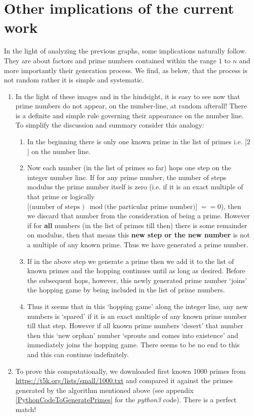 \documentclass[10pt, twoside]{article}
\begin{document}
\section{Other implications of the current work}
In the light of analyzing the previous graphs, some implications naturally follow. They are about factors and prime numbers contained within the range $1$ to $n$ and more importantly their generation process. We find, as below, that the process is not random rather it is simple and systematic.	 
\begin{enumerate}
	\item In the light of these images and in the hindsight, it is easy to see now that prime numbers do not appear, on the number-line, at random afterall! There is a definite and simple rule governing their appearance on the number line. To simplify the discussion and summary consider this analogy: 
	\begin{enumerate}
	\item In the beginning there is only one known prime in the list of primes i.e. [$2$] on the number line. 
	\item Now each number (in the list of primes so far) hops one step on the integer number line. If for any prime number, the number of steps modulus the prime number itself is zero (i.e. if it is an exact multiple of that prime or logically $\text{[(number of steps )} \mod \text{(the particular prime number)]} == 0$), then we discard that number from the consideration of being a prime. However if for \textbf{all} numbers (in the list of primes till then) there is some remainder on modulus, then that means this \textbf{new step or the new number} is not a multiple of any known prime. Thus we have generated a prime number.
	\item If in the above step we generate a prime then we add it to the list of known primes and the hopping continues until as long as desired. Before the subsequent hops, however, this newly generated prime number `joins' the hopping game by being included in the list of prime numbers.
	\item Thus it seems that in this `hopping game' along the integer line, any new numbers is `spared' if it is an exact multiple of any known prime number till that step. However if all known prime numbers `desert' that number then this `new orphan' number `sprouts and comes into existence' and immediately joins the hopping game. There seems to be no end to this and this can continue indefinitely.
	\end{enumerate}
	\item To prove this computationally, we downloaded first known 1000 primes from \url{https://t5k.org/lists/small/1000.txt}  and compared it against the primes generated by the algorithm mentioned above (see appendix \ref{PythonCodeToGeneratePrimes} for the \textit{python3} code). There is a perfect match!\label{PrimeNumberGeneration}
	
\end{enumerate}
 
\end{document}
